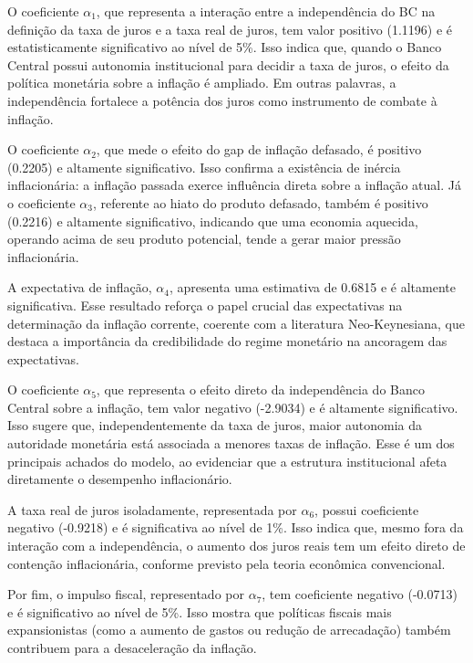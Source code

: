 \documentclass[a4paper,12pt]{article}
\begin{document}
O coeficiente $\alpha_1$, que representa a interação entre a independência do BC na definição da taxa de juros e a taxa real de juros, tem valor positivo (1.1196) e é estatisticamente significativo ao nível de 5\%. Isso indica que, quando o Banco Central possui autonomia institucional para decidir a taxa de juros, o efeito da política monetária sobre a inflação é ampliado. Em outras palavras, a independência fortalece a potência dos juros como instrumento de combate à inflação.

O coeficiente $\alpha_2$, que mede o efeito do gap de inflação defasado, é positivo (0.2205) e altamente significativo. Isso confirma a existência de inércia inflacionária: a inflação passada exerce influência direta sobre a inflação atual. Já o coeficiente $\alpha_3$, referente ao hiato do produto defasado, também é positivo (0.2216) e altamente significativo, indicando que uma economia aquecida, operando acima de seu produto potencial, tende a gerar maior pressão inflacionária.

A expectativa de inflação, $\alpha_4$, apresenta uma estimativa de 0.6815 e é altamente significativa. Esse resultado reforça o papel crucial das expectativas na determinação da inflação corrente, coerente com a literatura Neo-Keynesiana, que destaca a importância da credibilidade do regime monetário na ancoragem das expectativas.

O coeficiente $\alpha_5$, que representa o efeito direto da independência do Banco Central sobre a inflação, tem valor negativo (-2.9034) e é altamente significativo. Isso sugere que, independentemente da taxa de juros, maior autonomia da autoridade monetária está associada a menores taxas de inflação. Esse é um dos principais achados do modelo, ao evidenciar que a estrutura institucional afeta diretamente o desempenho inflacionário.

A taxa real de juros isoladamente, representada por $\alpha_6$, possui coeficiente negativo (-0.9218) e é significativa ao nível de 1\%. Isso indica que, mesmo fora da interação com a independência, o aumento dos juros reais tem um efeito direto de contenção inflacionária, conforme previsto pela teoria econômica convencional.

Por fim, o impulso fiscal, representado por $\alpha_7$, tem coeficiente negativo (-0.0713) e é significativo ao nível de 5\%. Isso mostra que políticas fiscais mais expansionistas (como a aumento de gastos ou redução de arrecadação) também contribuem para a desaceleração da inflação.
\end{document}
